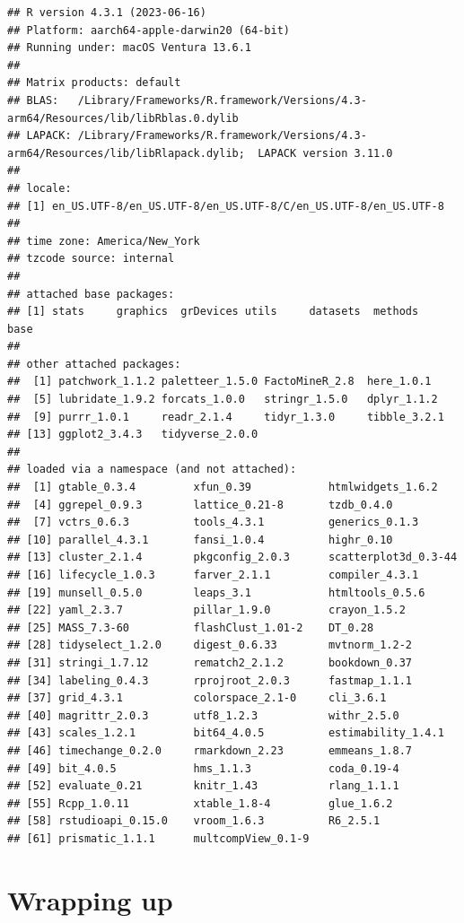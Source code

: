 \documentclass[
]{book}
\begin{document}
\begin{verbatim}
## R version 4.3.1 (2023-06-16)
## Platform: aarch64-apple-darwin20 (64-bit)
## Running under: macOS Ventura 13.6.1
## 
## Matrix products: default
## BLAS:   /Library/Frameworks/R.framework/Versions/4.3-arm64/Resources/lib/libRblas.0.dylib 
## LAPACK: /Library/Frameworks/R.framework/Versions/4.3-arm64/Resources/lib/libRlapack.dylib;  LAPACK version 3.11.0
## 
## locale:
## [1] en_US.UTF-8/en_US.UTF-8/en_US.UTF-8/C/en_US.UTF-8/en_US.UTF-8
## 
## time zone: America/New_York
## tzcode source: internal
## 
## attached base packages:
## [1] stats     graphics  grDevices utils     datasets  methods   base     
## 
## other attached packages:
##  [1] patchwork_1.1.2 paletteer_1.5.0 FactoMineR_2.8  here_1.0.1     
##  [5] lubridate_1.9.2 forcats_1.0.0   stringr_1.5.0   dplyr_1.1.2    
##  [9] purrr_1.0.1     readr_2.1.4     tidyr_1.3.0     tibble_3.2.1   
## [13] ggplot2_3.4.3   tidyverse_2.0.0
## 
## loaded via a namespace (and not attached):
##  [1] gtable_0.3.4         xfun_0.39            htmlwidgets_1.6.2   
##  [4] ggrepel_0.9.3        lattice_0.21-8       tzdb_0.4.0          
##  [7] vctrs_0.6.3          tools_4.3.1          generics_0.1.3      
## [10] parallel_4.3.1       fansi_1.0.4          highr_0.10          
## [13] cluster_2.1.4        pkgconfig_2.0.3      scatterplot3d_0.3-44
## [16] lifecycle_1.0.3      farver_2.1.1         compiler_4.3.1      
## [19] munsell_0.5.0        leaps_3.1            htmltools_0.5.6     
## [22] yaml_2.3.7           pillar_1.9.0         crayon_1.5.2        
## [25] MASS_7.3-60          flashClust_1.01-2    DT_0.28             
## [28] tidyselect_1.2.0     digest_0.6.33        mvtnorm_1.2-2       
## [31] stringi_1.7.12       rematch2_2.1.2       bookdown_0.37       
## [34] labeling_0.4.3       rprojroot_2.0.3      fastmap_1.1.1       
## [37] grid_4.3.1           colorspace_2.1-0     cli_3.6.1           
## [40] magrittr_2.0.3       utf8_1.2.3           withr_2.5.0         
## [43] scales_1.2.1         bit64_4.0.5          estimability_1.4.1  
## [46] timechange_0.2.0     rmarkdown_2.23       emmeans_1.8.7       
## [49] bit_4.0.5            hms_1.1.3            coda_0.19-4         
## [52] evaluate_0.21        knitr_1.43           rlang_1.1.1         
## [55] Rcpp_1.0.11          xtable_1.8-4         glue_1.6.2          
## [58] rstudioapi_0.15.0    vroom_1.6.3          R6_2.5.1            
## [61] prismatic_1.1.1      multcompView_0.1-9
\end{verbatim}

\chapter{Wrapping up}\label{wrapping-up-1}
\end{document}
